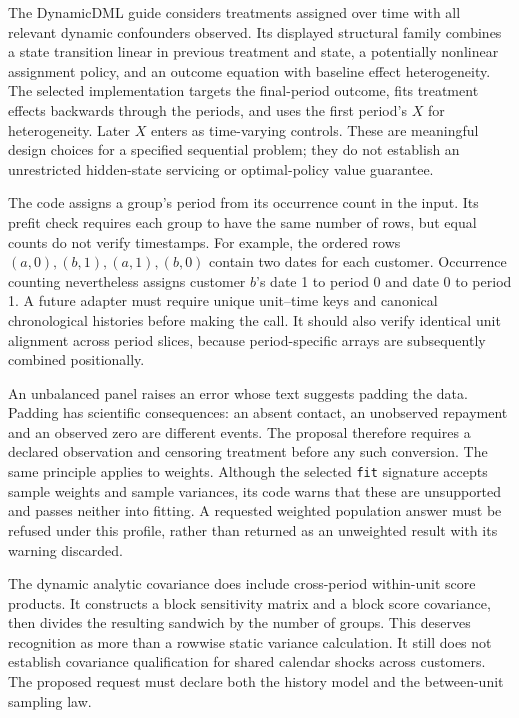 The DynamicDML guide considers treatments assigned over time with all relevant
dynamic confounders observed. Its displayed structural family combines a
state transition linear in previous treatment and state, a potentially
nonlinear assignment policy, and an outcome equation with baseline effect
heterogeneity. The selected implementation targets the final-period outcome,
fits treatment effects backwards through the periods, and uses the first
period's $X$ for heterogeneity. Later $X$ enters as time-varying controls.
These are meaningful design choices for a specified sequential problem; they
do not establish an unrestricted hidden-state servicing or optimal-policy
value guarantee.\citep{exec19_econml_source}

The code assigns a group's period from its occurrence count in the input.
Its prefit check requires each group to have the same number of rows, but
equal counts do not verify timestamps. For example, the ordered rows
$(a,0),(b,1),(a,1),(b,0)$ contain two dates for each customer. Occurrence
counting nevertheless assigns customer $b$'s date 1 to period 0 and date 0
to period 1. A future adapter must require unique unit--time keys and
canonical chronological histories before making the call. It should also
verify identical unit alignment across period slices, because period-specific
arrays are subsequently combined positionally.
\citep{exec19_econml_source,exec19_econml_reference}

An unbalanced panel raises an error whose text suggests padding the data.
Padding has scientific consequences: an absent contact, an unobserved
repayment and an observed zero are different events. The proposal therefore
requires a declared observation and censoring treatment before any such
conversion. The same principle applies to weights. Although the selected
\texttt{fit} signature accepts sample weights and sample variances, its code
warns that these are unsupported and passes neither into fitting. A requested
weighted population answer must be refused under this profile, rather than
returned as an unweighted result with its warning discarded.
\citep{exec19_econml_source}

The dynamic analytic covariance does include cross-period within-unit score
products. It constructs a block sensitivity matrix and a block score
covariance, then divides the resulting sandwich by the number of groups.
This deserves recognition as more than a rowwise static variance calculation.
It still does not establish covariance qualification for shared calendar
shocks across customers. The proposed request must declare both the history
model and the between-unit sampling law.\citep{exec19_econml_source}

